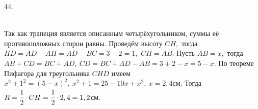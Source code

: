 44. \begin{figure}[ht!]
\end{figure}\\
Так как трапеция является описанным четырёхугольником, суммы её противоположных сторон равны. Проведём высоту $CH,$ тогда $HD=AD-AH=AD-BC=3-2=1,$ $CH=AB.$ Пусть $AB=x,$ тогда $AB+CD=BC+AD,\ CD=BC+AD-AB=3+2-x=5-x.$ По теореме Пифагора для треугольника $CHD$ имеем $x^2+1^2=(5-x)^2,\ x^2+1=25-10x+x^2,\ x=2,4$см. Тогда $R=\cfrac{1}{2}\cdot CH=\cfrac{1}{2}\cdot 2,4=1,2$см.\\
